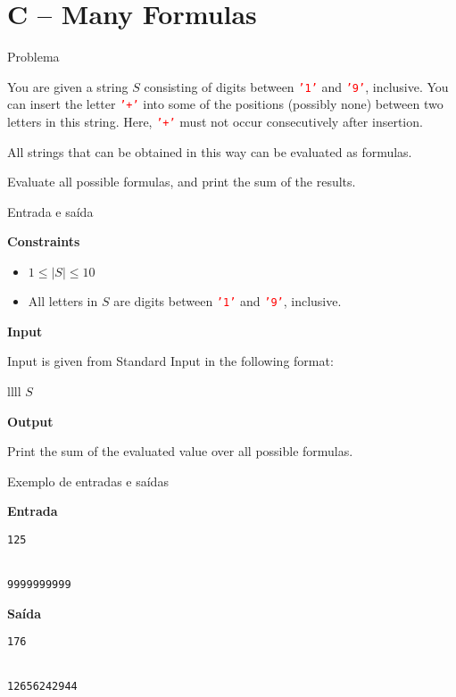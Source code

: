 \section{C -- Many Formulas}

\begin{frame}[fragile]{Problema}

You are given a string $S$ consisting of digits between \texttt{\textcolor{red}{'1'}} and
\texttt{\textcolor{red}{'9'}}, inclusive. You can insert the letter \texttt{\textcolor{red}{'+'}}
into some of the positions (possibly none) between two letters in this string. Here,
\texttt{\textcolor{red}{'+'}} must not occur consecutively after insertion.

All strings that can be obtained in this way can be evaluated as formulas.

Evaluate all possible formulas, and print the sum of the results.

\end{frame}

\begin{frame}[fragile]{Entrada e saída}

\textbf{Constraints}

\begin{itemize}
    \item $1\leq |S| \leq 10$
    \item All letters in $S$ are digits between \texttt{\textcolor{red}{'1'}} and
        \texttt{\textcolor{red}{'9'}}, inclusive. 
\end{itemize}

\textbf{Input}

Input is given from Standard Input in the following format:
\begin{atcoderio}{llll}
$S$ \\
\end{atcoderio}

\textbf{Output}

Print the sum of the evaluated value over all possible formulas.

\end{frame}

\begin{frame}[fragile]{Exemplo de entradas e saídas}

\begin{minipage}[t]{0.45\textwidth}
\textbf{Entrada}
\begin{verbatim}
125


9999999999
\end{verbatim}
\end{minipage}
\begin{minipage}[t]{0.5\textwidth}
\textbf{Saída}
\begin{verbatim}
176


12656242944
\end{verbatim}
\end{minipage}
\end{frame}

